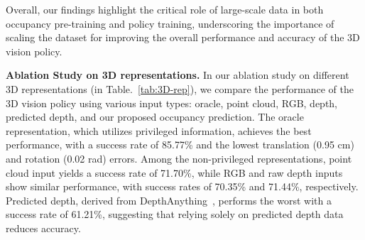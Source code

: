 Overall, our findings highlight the critical role of large-scale data in both occupancy pre-training and policy training, underscoring the importance of scaling the dataset for improving the overall performance and accuracy of the 3D vision policy.



\begin{table}
\centering
{}
\caption{ Ablation on 3D representations. We replace the visual observation and the corresponding encoder in our 3D vision policy to evaluate different 3D representations.}
\label{tab:3D-rep}
\end{table}

\textbf{Ablation Study on 3D representations.} In our ablation study on different 3D representations (in Table.~\ref{tab:3D-rep}), we compare the performance of the 3D vision policy using various input types: oracle, point cloud, RGB, depth, predicted depth, and our proposed occupancy prediction. The oracle representation, which utilizes privileged information, achieves the best performance, with a success rate of 85.77\% and the lowest translation (0.95 cm) and rotation (0.02 rad) errors. Among the non-privileged representations, point cloud input yields a success rate of 71.70\%, while RGB and raw depth inputs show similar performance, with success rates of 70.35\% and 71.44\%, respectively. Predicted depth, derived from DepthAnything~\cite{yang2024depth}, performs the worst with a success rate of 61.21\%, suggesting that relying solely on predicted depth data reduces accuracy.

